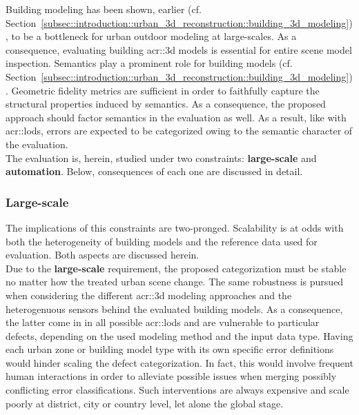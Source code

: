         Building modeling has been shown, earlier (cf. Section~\ref{subsec::introduction::urban_3d_reconstruction::building_3d_modeling}), to be a bottleneck for urban outdoor modeling at large-scales.
        As a consequence, evaluating building \gls{acr::3d} models is essential for entire scene model inspection.
        Semantics play a prominent role for building models (cf. Section~\ref{subsec::introduction::urban_3d_reconstruction::building_3d_modeling}).
        Geometric fidelity metrics are sufficient in order to faithfully capture the structural properties induced by semantics.
        As a consequence, the proposed approach should factor semantics in the evaluation as well.
        As a result, like with \glspl{acr::lod}, errors are expected to be categorized owing to the semantic character of the evaluation.\\

        The evaluation is, herein, studied under two constraints: \textbf{large-scale} and \textbf{automation}.
        Below, consequences of each one are discussed in detail.
        \subsubsection{Large-scale}
            The implications of this constraints are two-pronged.
            Scalability is at odds with both the heterogeneity of building models and the reference data used for evaluation.
            Both aspects are discussed herein.\\

            Due to the \textbf{large-scale} requirement, the proposed categorization must be stable no matter how the treated urban scene change.
            The same robustness is pursued when considering the different \gls{acr::3d} modeling approaches and the heterogenuous sensors behind the evaluated building models.
            As a consequence, the latter come in in all possible \glspl{acr::lod} and are vulnerable to particular defects, depending on the used modeling method and the input data type.
            Having each urban zone or building model type with its own specific error definitions would hinder scaling the defect categorization.
            In fact, this would involve frequent human interactions in order to alleviate possible issues when merging possibly conflicting error classifications.
            Such interventions are always expensive and scale poorly at district, city or country level, let alone the global stage.\\


